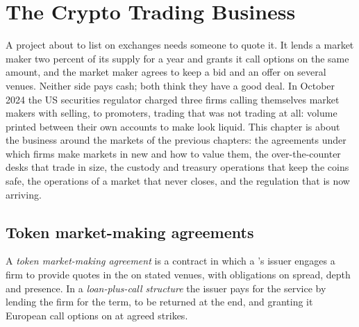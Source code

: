 \chapter{The Crypto Trading Business}\label{ch:m3:the-crypto-trading-business}

A  project about to list on exchanges needs someone to quote it. It lends a market maker two percent
of its  supply for a year and grants it call options on the same amount, and the market maker agrees
to keep a bid and an offer on several venues. Neither side pays cash; both think they have a good deal. In
October 2024 the US securities regulator charged three firms calling themselves market
makers with selling, to  promoters, trading that was not trading at all: volume printed between their
own accounts to make  look liquid. This chapter is about the business around the markets of the
previous chapters: the agreements under which firms make markets in new  and how to value them,
the over-the-counter desks that trade in size, the custody and treasury operations that keep the coins
safe, the operations of a market that never closes, and the regulation that is now arriving.

\section{Token market-making agreements}

\begin{definition}\label{def:m3:the-crypto-trading-business:tmma}
A \emph{token market-making agreement} is a contract in which a 's issuer engages
a firm to provide quotes in the  on stated venues, with obligations on spread, depth and presence. In a
\emph{loan-plus-call structure} the issuer pays for the service by lending the firm 
for the term, to be returned at the end, and granting it European call options on  at agreed strikes.
\end{definition}

